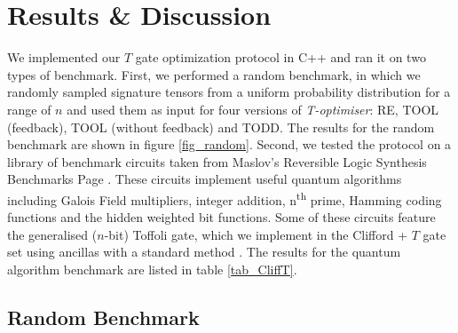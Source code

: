 \documentclass[notitlepage]{article}
\theoremstyle{definition}
\theoremstyle{problem}
\theoremstyle{lemma}
\begin{document}
	\section{Results \& Discussion}
	\label{sec_results}
	We implemented our $T$ gate optimization protocol in C++ and ran it on two types of benchmark. First, we performed a random benchmark, in which we randomly sampled signature tensors from a uniform probability distribution for a range of $n$ and used them as input for four versions of \emph{T-optimiser}: RE, TOOL (feedback), TOOL (without feedback) and TODD. The results for the random benchmark are shown in figure \ref{fig_random}. Second, we tested the protocol on a library of benchmark circuits taken from Maslov's Reversible Logic Synthesis Benchmarks Page \cite{37_Maslov_web}. These circuits implement useful quantum algorithms including Galois Field multipliers, integer addition, n\textsuperscript{th} prime, Hamming coding functions and the hidden weighted bit functions. Some of these circuits feature the generalised ($n$-bit) Toffoli gate, which we implement in the Clifford + $T$ gate set using ancillas with a standard method \cite{35_Nielsen:2011:QCQ:1972505}. The results for the quantum algorithm benchmark are listed in table \ref{tab_CliffT}.
	
	\subsection{Random Benchmark}
\end{document}
